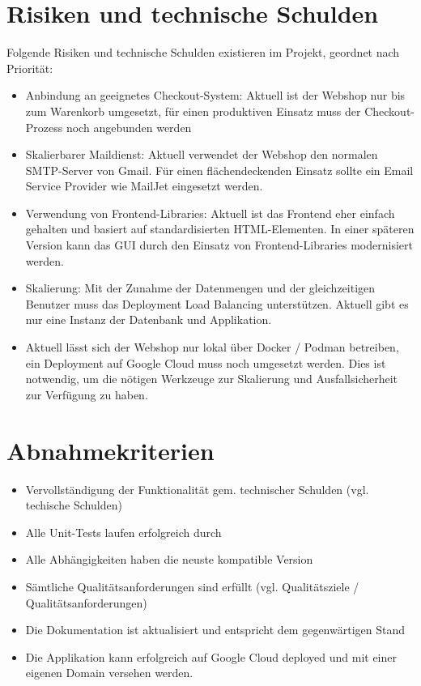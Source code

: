 \documentclass[
]{article}
\begin{document}
\hypertarget{section-technical-risks}{%
\section{Risiken und technische
Schulden}\label{section-technical-risks}}


Folgende Risiken und technische Schulden existieren im Projekt, geordnet nach Priorität:
\begin{itemize}
\item Anbindung an geeignetes Checkout-System: Aktuell ist der Webshop nur bis zum Warenkorb umgesetzt, für einen produktiven Einsatz muss der Checkout-Prozess noch angebunden werden
\item Skalierbarer Maildienst: Aktuell verwendet der Webshop den normalen SMTP-Server von Gmail. Für einen flächendeckenden Einsatz sollte ein Email Service Provider wie MailJet eingesetzt werden.
\item Verwendung von Frontend-Libraries: Aktuell ist das Frontend eher einfach gehalten und basiert auf standardisierten HTML-Elementen. In einer späteren Version kann das GUI durch den Einsatz von Frontend-Libraries modernisiert werden.
\item Skalierung: Mit der Zunahme der Datenmengen und der gleichzeitigen Benutzer muss das Deployment Load Balancing unterstützen. Aktuell gibt es nur eine Instanz der Datenbank und Applikation.
\item Aktuell lässt sich der Webshop nur lokal über Docker / Podman betreiben, ein Deployment auf Google Cloud muss noch umgesetzt werden. Dies ist notwendig, um die nötigen Werkzeuge zur Skalierung und Ausfallsicherheit zur Verfügung zu haben.
\end{itemize}


\section{Abnahmekriterien}
\begin{itemize}
\item Vervollständigung der Funktionalität gem. technischer Schulden (vgl. techische Schulden)
\item Alle Unit-Tests laufen erfolgreich durch
\item Alle Abhängigkeiten haben die neuste kompatible Version
\item Sämtliche Qualitätsanforderungen sind erfüllt (vgl. Qualitätsziele / Qualitätsanforderungen)
\item Die Dokumentation ist aktualisiert und entspricht dem gegenwärtigen Stand
\item Die Applikation kann erfolgreich auf Google Cloud deployed und mit einer eigenen Domain versehen werden.
\end{itemize}
\end{document}
